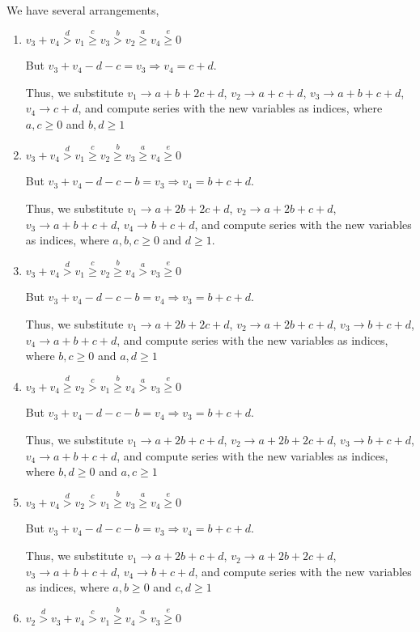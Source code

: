 \documentclass{article}
\begin{document}
We have several arrangements,
\begin{enumerate}
    \item 
$v_3+v_4\overset{d}{>}v_1\overset{c}{\geq}v_3\overset{b}{>}{v_2}\overset{a}{\geq}v_4\overset{e}{\geq}{0}$

But $v_3+v_4-d-c=v_3\Rightarrow{v_4=c+d}.$

Thus, we substitute $v_1\rightarrow{a+b+2c+d}$, $v_2\rightarrow{a+c+d}$, $v_3\rightarrow{a+b+c+d}$, $v_4\rightarrow{c+d}$, and compute series with the new variables as indices, where $a,c\geq{0}$ and $b,d\geq{1}$  
    \item 
$v_3+v_4\overset{d}{>}v_1\overset{c}{\geq}v_2\overset{b}{\geq}{v_3}\overset{a}{\geq}v_4\overset{e}{\geq}{0}$

But $v_3+v_4-d-c-b=v_3\Rightarrow{v_4=b+c+d}.$

Thus, we substitute $v_1\rightarrow{a+2b+2c+d}$, $v_2\rightarrow{a+2b+c+d}$, $v_3\rightarrow{a+b+c+d}$, $v_4\rightarrow{b+c+d}$, and compute series with the new variables as indices, where $a,b,c\geq{0}$ and $d\geq{1}$.  
    \item 
$v_3+v_4\overset{d}{>}v_1\overset{c}{\geq}v_2\overset{b}{\geq}{v_4}\overset{a}{>}v_3\overset{e}{\geq}{0}$

But $v_3+v_4-d-c-b=v_4\Rightarrow{v_3=b+c+d}.$

Thus, we substitute $v_1\rightarrow{a+2b+2c+d}$, $v_2\rightarrow{a+2b+c+d}$, $v_3\rightarrow{b+c+d}$, $v_4\rightarrow{a+b+c+d}$, and compute series with the new variables as indices, where $b,c\geq{0}$ and $a,d\geq{1}$
    \item 
$v_3+v_4\overset{d}{\geq}v_2\overset{c}{>}v_1\overset{b}{\geq}{v_4}\overset{a}{>}v_3\overset{e}{\geq}{0}$

But $v_3+v_4-d-c-b=v_4\Rightarrow{v_3=b+c+d}.$

Thus, we substitute $v_1\rightarrow{a+2b+c+d}$, $v_2\rightarrow{a+2b+2c+d}$, $v_3\rightarrow{b+c+d}$, $v_4\rightarrow{a+b+c+d}$, and compute series with the new variables as indices, where $b,d\geq{0}$ and $a,c\geq{1}$
    \item 
$v_3+v_4\overset{d}>v_2\overset{c}{>}v_1\overset{b}{\geq}{v_3}\overset{a}{\geq}v_4\overset{e}{\geq}{0}$

But $v_3+v_4-d-c-b=v_3\Rightarrow{v_4=b+c+d}.$

Thus, we substitute $v_1\rightarrow{a+2b+c+d}$, $v_2\rightarrow{a+2b+2c+d}$, $v_3\rightarrow{a+b+c+d}$, $v_4\rightarrow{b+c+d}$, and compute series with the new variables as indices, where $a,b\geq{0}$ and $c,d\geq{1}$
    \item 
$v_2\overset{d}{>}v_3+v_4\overset{c}{>}v_1\overset{b}{\geq}{v_4}\overset{a}{>}v_3\overset{e}{\geq}{0}$


\end{enumerate}
\end{document}
